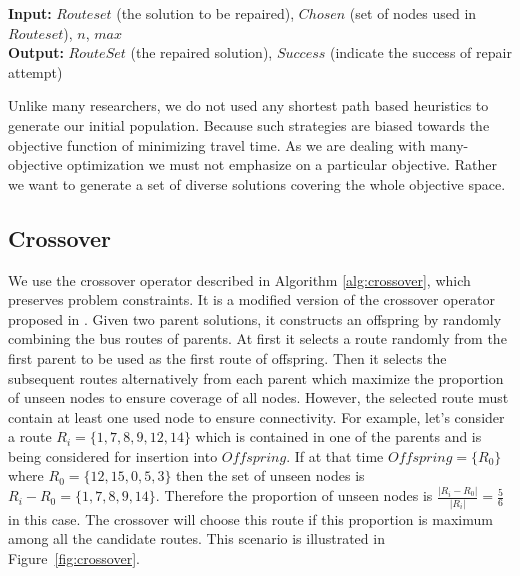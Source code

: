 \begin{algorithm}[!htbp]
	\caption{$ Repair(Routeset, Chosen, n, max) $}
	\textbf{Input:} $Routeset$ (the solution to be repaired), $Chosen$ (set of nodes used in $Routeset$), $n$, $max$\\
	\textbf{Output:} $RouteSet$ (the repaired solution), $Success$ (indicate the success of repair attempt)
	\begin{algorithmic}[1]\label{alg:repair}
		\REPEAT
		\ENDIF
		\ENDIF
		\end{algorithmic}
\end{algorithm}

Unlike many researchers, we do not used any shortest path based heuristics to generate our initial population. Because such strategies are biased towards the objective function of minimizing travel time. As we are dealing with many-objective optimization we must not emphasize on a particular objective. Rather we want to generate a set of diverse solutions covering the whole objective space.

\subsection{Crossover}
We use the crossover operator described in Algorithm \ref{alg:crossover}, which preserves problem constraints. It is a modified version of the crossover operator proposed in \cite{mumford2013new}. Given two parent solutions, it constructs an offspring by randomly combining the bus routes of parents. At first it selects a route randomly from the first parent to be used as the first route of offspring. Then it selects the subsequent routes alternatively from each parent which maximize the proportion of unseen nodes to ensure coverage of all nodes. However, the selected route must contain at least one used node to ensure connectivity. For example, let's consider a route $ R_i = \{1, 7, 8, 9, 12, 14\} $ which is contained in one of the parents and is being considered for insertion into $Offspring$. If at that time $ Offspring = \{R_0\} $ where $ R_0 = \{12, 15, 0, 5, 3\} $ then the set of unseen nodes is $ R_i-R_0 = \{1, 7, 8, 9, 14\} $. Therefore the proportion of unseen nodes is $\frac{|R_i - R_0|}{ |R_i|} = \frac{5}{6}$ in this case. The crossover will choose this route if this proportion is maximum among all the candidate routes. This scenario is illustrated in Figure~\ref{fig:crossover}.

